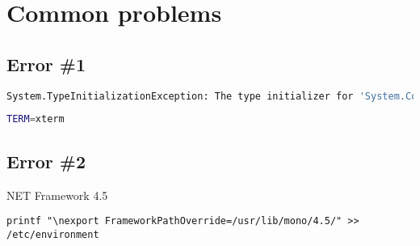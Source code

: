 \section{Common problems}

\subsection{Error \#1}

\begin{lstlisting}[language=bash]
System.TypeInitializationException: The type initializer for 'System.Console' threw an exception. ---> System.TypeInitializationException: The type initializer for 'System.ConsoleDriver' threw an exception. ---> System.Exception: Magic number is wrong: 542
\end{lstlisting}

\begin{lstlisting}[language=bash]
TERM=xterm
\end{lstlisting}

\subsection{Error \#2}

NET Framework 4.5

\begin{lstlisting}
printf "\nexport FrameworkPathOverride=/usr/lib/mono/4.5/" >> /etc/environment
\end{lstlisting}

